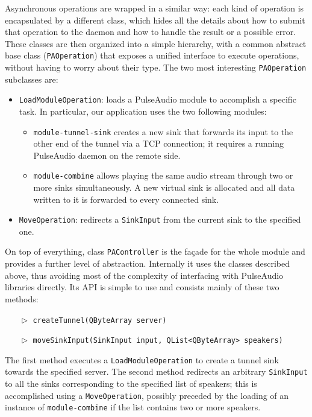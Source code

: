 \documentclass{IEEEtran}
\begin{document}
Asynchronous operations are wrapped in a similar way: each kind of operation is encapsulated by a different class, which hides all the details about how to submit that operation to the daemon and how to handle the result or a possible error. These classes are then organized into a simple hierarchy, with a common abstract base class (\texttt{PAOperation}) that exposes a unified interface to execute operations, without having to worry about their type. The two most interesting \texttt{PAOperation} subclasses are:
\begin{itemize}
	\item \texttt{LoadModuleOperation}: loads a PulseAudio module to accomplish a specific task. In particular, our application uses the two following modules:
	\begin{itemize}
		\item \texttt{module-tunnel-sink} creates a new sink that forwards its input to the other end of the tunnel via a TCP connection; it requires a running PulseAudio daemon on the remote side.
		\item \texttt{module-combine} allows playing the same audio stream through two or more sinks simultaneously. A new virtual sink is allocated and all data written to it is forwarded to every connected sink.
	\end{itemize}
	\item \texttt{MoveOperation}: redirects a \texttt{SinkInput} from the current sink to the specified one.
\end{itemize}

On top of everything, class \texttt{PAController} is the façade for the whole module and provides a further level of abstraction. Internally it uses the classes described above, thus avoiding most of the complexity of interfacing with PulseAudio libraries directly. Its API is simple to use and consists mainly of these two methods:
\begin{itemize}
\item[$\vartriangleright$] \texttt{createTunnel(QByteArray server)}
\item[$\vartriangleright$] \texttt{moveSinkInput(SinkInput input, QList<QByteArray> speakers)}
\end{itemize}
The first method executes a \texttt{LoadModuleOperation} to create a tunnel sink towards the specified server. The second method redirects an arbitrary \texttt{SinkInput} to all the sinks corresponding to the specified list of speakers; this is accomplished using a \texttt{MoveOperation}, possibly preceded by the loading of an instance of \texttt{module-combine} if the list contains two or more speakers.
\end{document}
